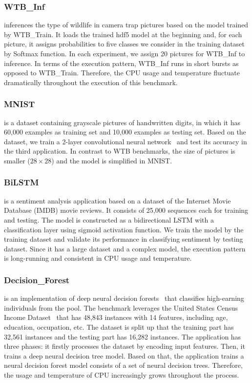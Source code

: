 \subsubsection{WTB\_Inf}

inferences the type of wildlife in camera trap pictures based on the model trained by WTB\_Train. It loads the trained hdf5 model at the beginning and, for each picture, it assigns probabilities to five classes we consider in the training dataset by Softmax function. In each experiment, we assign 20 pictures for WTB\_Inf to inference. In terms of the execution pattern, WTB\_Inf runs in short bursts as opposed to WTB\_Train. Therefore, the CPU usage and temperature fluctuate dramatically throughout the execution of this benchmark.

\subsubsection{MNIST}

 is a dataset containing grayscale pictures of handwritten digits, in which it has 60,000 examples as training set and 10,000 examples as testing set. Based on the dataset, we train a 2-layer convolutional neural network~\cite{ref:MNIST} and test its accuracy in the third application. In contrast to WTB benchmarks, the size of pictures is smaller ($28 \times 28$) and the model is simplified in MNIST. 

\subsubsection{BiLSTM} is a sentiment analysis application based on a dataset of the Internet Movie Database (IMDB) movie reviews. It consists of 25,000 sequences each for training and testing. The model is constructed as a bidirectional LSTM with a classification layer using sigmoid activation function. We train the model by the training dataset and validate its performance in classifying sentiment by testing dataset. Since it has a large dataset and a complex model, the execution pattern is long-running and consistent in CPU usage and temperature.


\subsubsection{Decision\_Forest} is an implementation of deep neural decision forests~\cite{ref:decision_forest} that classifies high-earning individuals from the pool. The benchmark leverages the United States Census Income Dataset~\cite{ref:uci} that has 48,843 instances with 14 features, including age, education, occupation, etc. The dataset is split up that the training part has 32,561 instances and the testing part has 16,282 instances. The application has three phases: it firstly processes the dataset by encoding input features. Then, it trains a deep neural decision tree model. Based on that, the application trains a neural decision forest model consists of a set of neural decision trees. Therefore, the usage and temperature of CPU increasingly grows throughout the process.


